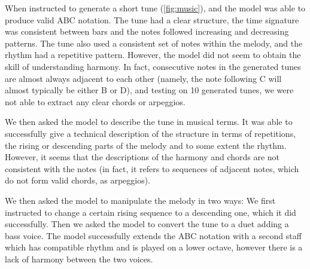 When instructed to generate a short tune (\ref{fig:music}), and the model was able to produce valid ABC notation. The tune had a clear structure, the time signature was consistent between bars and the notes followed increasing and decreasing patterns. The tune also used a consistent set of notes within the melody, and the rhythm had a repetitive pattern. However, the model did not seem to obtain the skill of understanding harmony. In fact, consecutive notes in the generated tunes are almost always adjacent to each other (namely, the note following C will almost typically be either B or D), and testing on 10 generated tunes, we were not able to extract any clear chords or arpeggios.

We then asked the model to describe the tune in musical terms. It was able to successfully give a technical description of the structure in terms of repetitions, the rising or descending parts of the melody and to some extent the rhythm. However, it seems that the descriptions of the harmony and chords are not consistent with the notes (in fact, it refers to sequences of adjacent notes, which do not form valid chords, as arpeggios).

We then asked the model to manipulate the melody in two ways: We first instructed to change a certain rising sequence to a descending one, which it did successfully. Then we asked the model to convert the tune to a duet adding a bass voice. The model successfully extends the ABC notation with a second staff which has compatible rhythm and is played on a lower octave, however there is a lack of harmony between the two voices.

